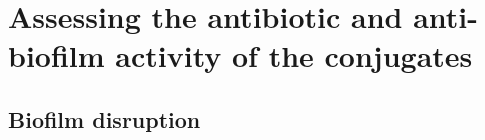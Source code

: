 \newpage

\section{Assessing the antibiotic and anti-biofilm activity of the conjugates}

\subsection{Biofilm disruption}

